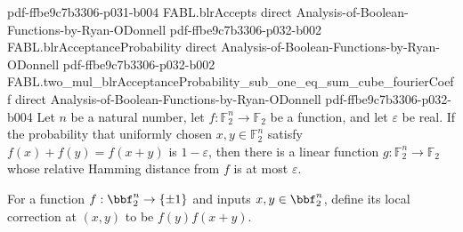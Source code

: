 \begin{theorem}
  {pdf-ffbe9c7b3306-p031-b004}
\proofstep
  {FABL.blrAccepts}
  {direct}
  {Analysis-of-Boolean-Functions-by-Ryan-ODonnell}
  {pdf-ffbe9c7b3306-p032-b002}
\proofstep
  {FABL.blrAcceptanceProbability}
  {direct}
  {Analysis-of-Boolean-Functions-by-Ryan-ODonnell}
  {pdf-ffbe9c7b3306-p032-b002}
\proofstep
  {FABL.two_mul_blrAcceptanceProbability_sub_one_eq_sum_cube_fourierCoeff}
  {direct}
  {Analysis-of-Boolean-Functions-by-Ryan-ODonnell}
  {pdf-ffbe9c7b3306-p032-b004}
Let $n$ be a natural number, let $f:\mathbb F_2^n\to\mathbb F_2$ be a function, and let
$\varepsilon$ be real. If the probability that uniformly chosen $x,y\in\mathbb F_2^n$
satisfy $f(x)+f(y)=f(x+y)$ is $1-\varepsilon$, then there is a linear function
$g:\mathbb F_2^n\to\mathbb F_2$ whose relative Hamming distance from $f$ is at most
$\varepsilon$.
\end{theorem}

\begin{definition}
\label{FABL.localCorrection}
\leanok
{}
For a function $f:\bbf_2^n\to\{\pm1\}$ and inputs $x,y\in\bbf_2^n$, define its local
correction at $(x,y)$ to be $f(y)f(x+y)$.
\end{definition}

